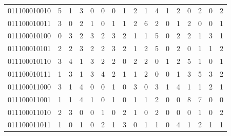 \documentclass[10pt,a4paper]{article}
\begin{document}
\begin{longtable}{ |c|c|c|c|c|c|c|c|c|c|c|c|c|c|c|c|c| }
    011100010010              & 5                            & 1                                & 3                            & 0                              & 0   & 0   & 1   & 2   & 1   & 4   & 1   & 2   & 0   & 2   & 0   & 2   \\
    011100010011              & 3                            & 0                                & 2                            & 1                              & 0   & 1   & 1   & 2   & 6   & 2   & 0   & 1   & 2   & 0   & 0   & 1   \\
    011100010100              & 0                            & 3                                & 2                            & 3                              & 2   & 3   & 2   & 1   & 1   & 5   & 0   & 2   & 2   & 1   & 3   & 1   \\
    011100010101              & 2                            & 2                                & 3                            & 2                              & 2   & 3   & 2   & 1   & 2   & 5   & 0   & 2   & 0   & 1   & 1   & 2   \\
    011100010110              & 3                            & 4                                & 1                            & 3                              & 2   & 2   & 0   & 2   & 2   & 0   & 1   & 2   & 5   & 1   & 0   & 1   \\
    011100010111              & 1                            & 3                                & 1                            & 3                              & 4   & 2   & 1   & 1   & 2   & 0   & 0   & 1   & 3   & 5   & 3   & 2   \\
    011100011000              & 3                            & 1                                & 4                            & 0                              & 0   & 1   & 0   & 3   & 0   & 3   & 1   & 4   & 1   & 1   & 2   & 1   \\
    011100011001              & 1                            & 1                                & 4                            & 1                              & 0   & 1   & 0   & 1   & 1   & 2   & 0   & 0   & 8   & 7   & 0   & 0   \\
    011100011010              & 2                            & 3                                & 0                            & 0                              & 1   & 0   & 2   & 1   & 0   & 2   & 0   & 0   & 0   & 1   & 0   & 2   \\
    011100011011              & 1                            & 0                                & 1                            & 0                              & 2   & 1   & 3   & 0   & 1   & 1   & 0   & 4   & 1   & 2   & 1   & 1   \\

\end{longtable}
\end{document}
